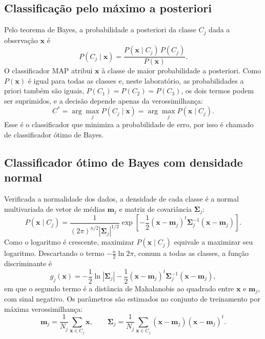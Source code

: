 \documentclass[12pt,a4paper]{article}
\begin{document}
\subsection{Classificação pelo máximo a posteriori}

Pelo teorema de Bayes, a probabilidade a posteriori da classe $C_j$ dada a observação $\mathbf{x}$ é
\begin{equation}
  P(C_j \mid \mathbf{x}) = \frac{P(\mathbf{x} \mid C_j)\,P(C_j)}{P(\mathbf{x})}.
  \label{eq:bayes}
\end{equation}
O classificador MAP atribui $\mathbf{x}$ à classe de maior probabilidade a posteriori. Como $P(\mathbf{x})$ é igual para todas as classes e, neste laboratório, as probabilidades a priori também são iguais, $P(C_1) = P(C_2) = P(C_3)$, os dois termos podem ser suprimidos, e a decisão depende apenas da verossimilhança:
\begin{equation}
  C^* = \arg\max_j P(C_j \mid \mathbf{x}) = \arg\max_j P(\mathbf{x} \mid C_j).
  \label{eq:map}
\end{equation}
Esse é o classificador que minimiza a probabilidade de erro, por isso é chamado de classificador ótimo de Bayes.

\subsection{Classificador ótimo de Bayes com densidade normal}

Verificada a normalidade dos dados, a densidade de cada classe é a normal multivariada de vetor de médias $\mathbf{m}_j$ e matriz de covariância $\boldsymbol{\Sigma}_j$:
\begin{equation}
  P(\mathbf{x} \mid C_j) = \frac{1}{(2\pi)^{n/2}|\boldsymbol{\Sigma}_j|^{1/2}}
  \exp\left[-\frac{1}{2}(\mathbf{x} - \mathbf{m}_j)^t\boldsymbol{\Sigma}_j^{-1}(\mathbf{x} - \mathbf{m}_j)\right].
  \label{eq:normal}
\end{equation}
Como o logaritmo é crescente, maximizar $P(\mathbf{x} \mid C_j)$ equivale a maximizar seu logaritmo. Descartando o termo $-\frac{n}{2}\ln 2\pi$, comum a todas as classes, a função discriminante é
\begin{equation}
  g_j(\mathbf{x}) = -\frac{1}{2}\ln|\boldsymbol{\Sigma}_j| - \frac{1}{2}(\mathbf{x} - \mathbf{m}_j)^t\boldsymbol{\Sigma}_j^{-1}(\mathbf{x} - \mathbf{m}_j),
  \label{eq:g_bayes}
\end{equation}
em que o segundo termo é a distância de Mahalanobis ao quadrado entre $\mathbf{x}$ e $\mathbf{m}_j$, com sinal negativo. Os parâmetros são estimados no conjunto de treinamento por máxima verossimilhança:
\begin{equation}
  \mathbf{m}_j = \frac{1}{N_j}\sum_{\mathbf{x} \in C_j}\mathbf{x}, \qquad
  \boldsymbol{\Sigma}_j = \frac{1}{N_j}\sum_{\mathbf{x} \in C_j}(\mathbf{x} - \mathbf{m}_j)(\mathbf{x} - \mathbf{m}_j)^t.
  \label{eq:estimativas}
\end{equation}
\end{document}
